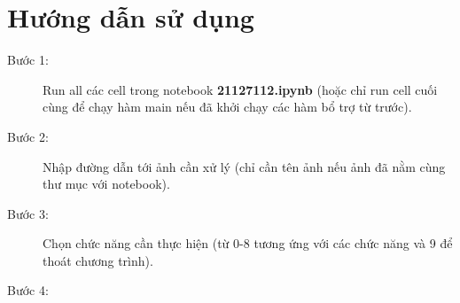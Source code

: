 \documentclass[]{article}
\begin{document}
\setlength{\parskip}{.7em}
\tableofcontents
\newpage

\setlength{\parskip}{.5em}
\newpage

\section{Hướng dẫn sử dụng}
\begin{description}
  \item[Bước 1:] Run all các cell trong notebook \textbf{21127112.ipynb} (hoặc chỉ run cell cuối cùng để chạy hàm main nếu đã khởi chạy các hàm bổ trợ từ trước).
  \item[Bước 2: ] Nhập đường dẫn tới ảnh cần xử lý (chỉ cần tên ảnh nếu ảnh đã nằm cùng thư mục với notebook).
  \item[Bước 3: ] Chọn chức năng cần thực hiện (từ 0-8 tương ứng với các chức năng và 9 để thoát chương trình).
  \item[Bước 4: ] 
\end{description}
\end{document}
